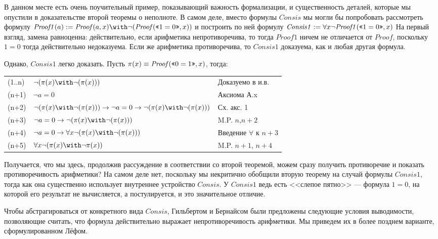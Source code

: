 В данном месте есть очень поучительный пример, показывающий важность 
формализации, и существенность деталей, которые мы опустили в доказательстве
второй теоремы о неполноте. В самом деле, вместо формулы $\mathit{Consis}$ мы могли бы 
попробовать рассмотреть формулу 
$\mathit{Proof1}(a) := \mathit{Proof} (a,x) \with \neg(\mathit{Proof} (\gq{1=0},x))$
и построить по ней формулу
$\mathit{Consis1} := \forall x \neg \mathit{Proof1} (\texttt{<<}1=0\texttt{>>},x)$ 
На первый взгляд, замена равноценна: действительно, 
если арифметика непротиворечива, то тогда $\mathit{Proof1}$ ничем не отличается от $\mathit{Proof}$,
поскольку $1=0$ тогда действительно недоказуема. Если же арифметика противоречива,
то $\mathit{Consis1}$ доказуема, как и любая другая формула.

Однако, $\mathit{Consis1}$ легко доказать. Пусть $\pi(x) \equiv \mathit{Proof}(\texttt{<<}0=1\texttt{>>},x)$, тогда:

\begin{tabular}{lll}
(1..n) & $\neg (\pi(x) \with \neg (\pi(x)))$ & Доказуемо в и.в.\\
(n+1) & $\neg a=0$ & Аксиома А.x\\
(n+2) & $\neg (\pi(x) \with \neg (\pi(x))) \rightarrow \neg a=0 \rightarrow \neg (\pi(x) \with \neg (\pi(x)))$ & Сх. акс. 1\\
(n+3) & $\neg a=0 \rightarrow \neg (\pi(x) \with \neg (\pi(x)))$ & M.P. $n$,$n+2$\\
(n+4) & $\neg a=0 \rightarrow \forall x \neg (\pi(x) \with \neg (\pi(x)))$ & Введение $\forall$ к $n+3$\\
(n+5) & $\forall x \neg (\pi(x) \with \neg \pi(x))$ & M.P. $n+1$, $n+4$
\end{tabular}

Получается, что мы здесь, продолжив рассуждение в соответствии со второй теоремой,
можем сразу получить противоречие и показать противоречивость арифметики?
На самом деле нет, поскольку мы некритично обобщили вторую теорему на 
случай формулы $\mathit{Consis1}$, тогда как она существенно использует внутреннее устройство $\mathit{Consis}$. 
У $\mathit{Consis1}$ ведь есть <<слепое пятно>> --- формула $1=0$, на которой его результат не вычисляется,
а постулируется, и это значительное отличие. 

Чтобы абстрагироваться от конкретного вида $\mathit{Consis}$, Гильбертом и Бернайсом были
предложены следующие условия выводимости, позволяющие считать, что формула действительно
выражает непротиворечивость арифметики. Мы приведем их в более позднем варианте,
сформулированном Лёфом.

